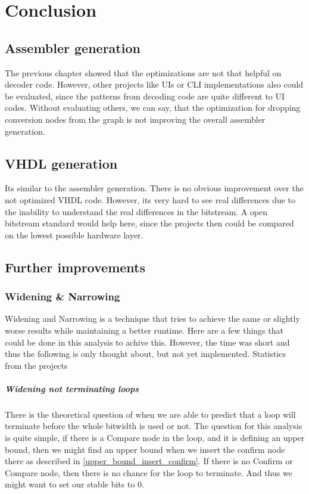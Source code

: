 \chapter{Conclusion}\label{sec:conclusion}

\section{Assembler generation}
The previous chapter showed that the optimizations are not that helpful on decoder code. However, other projects like UIs or CLI implementations also could be evaluated, since the patterns from decoding code are quite different to UI codes. Without evaluating others, we can say, that the optimization for dropping conversion nodes from the graph is not improving the overall assembler generation.

\section{VHDL generation}
Its similar to the assembler generation. There is no obvious improvement over the not optimized VHDL code. However, its very hard to see real differences due to the inability to understand the real differences in the bitstream. A open bitstream standard would help here, since the projects then could be compared on the lowest possible hardware layer.
\section{Further improvements}
\subsection{Widening \& Narrowing}

Widening and Narrowing is a technique that tries to achieve the same or slightly worse results while maintaining a better runtime. Here are a few things that could be done in this analysis to achive this. However, the time was short and thus the following is only thought about, but not yet implemented.
Statistics from the projects

\paragraph{Widening not terminating loops}

There is the theoretical question of when we are able to predict that a loop will terminate before the whole bitwidth is used or not. The question for this analysis is quite simple, if there is a Compare node in the loop, and it is defining an upper bound, then we might find an upper bound when we insert the confirm node there as described in \autoref{upper_bound_insert_confirm}. If there is no Confirm or Compare node, then there is no chance for the loop to terminate. And thus we might want to set our stable bits to 0.

